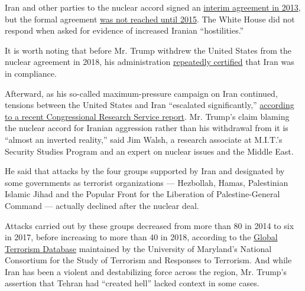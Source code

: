 Iran and other parties to the nuclear accord signed an
\href{https://www.nytimes3xbfgragh.onion/2013/11/24/world/middleeast/talks-with-iran-on-nuclear-deal-hang-in-balance.html}{interim
agreement in 2013}, but the formal agreement
\href{https://www.nytimes3xbfgragh.onion/2015/07/15/world/middleeast/iran-nuclear-deal-is-reached-after-long-negotiations.html}{was
not reached until 2015}. The White House did not respond when asked for
evidence of increased Iranian ``hostilities.''

It is worth noting that before Mr. Trump withdrew the United States from
the nuclear agreement in 2018, his administration
\href{https://www.nytimes3xbfgragh.onion/2017/07/17/us/politics/trump-iran-nuclear-deal-recertify.html}{repeatedly
certified} that Iran was in compliance.

Afterward, as his so-called maximum-pressure campaign on Iran continued,
tensions between the United States and Iran ``escalated significantly,''
\href{https://www.everycrsreport.com/files/20200106_R45795_9689491d73fa893072e210735ae913435277c51e.pdf}{according
to a recent Congressional Research Service report}. Mr. Trump's claim
blaming the nuclear accord for Iranian aggression rather than his
withdrawal from it is ``almost an inverted reality,'' said Jim Walsh, a
research associate at M.I.T.'s Security Studies Program and an expert on
nuclear issues and the Middle East.

He said that attacks by the four groups supported by Iran and designated
by some governments as terrorist organizations --- Hezbollah, Hamas,
Palestinian Islamic Jihad and the Popular Front for the Liberation of
Palestine-General Command --- actually declined after the nuclear deal.

Attacks carried out by these groups decreased from more than 80 in 2014
to six in 2017, before increasing to more than 40 in 2018, according to
the
\href{https://www.start.umd.edu/gtd/search/Results.aspx?start_yearonly=\&end_yearonly=\&start_year=\&start_month=\&start_day=\&end_year=\&end_month=\&end_day=\&asmSelect0=\&perpetrator=399\&perpetrator=407\&perpetrator=1930\&perpetrator=2108\&perpetrator=838\&perpetrator=4413\&dtp2=all\&success=yes\&casualties_type=b\&casualties_max=}{Global
Terrorism Database} maintained by the University of Maryland's National
Consortium for the Study of Terrorism and Responses to Terrorism. And
while Iran has been a violent and destabilizing force across the region,
Mr. Trump's assertion that Tehran had ``created hell'' lacked context in
some cases.

